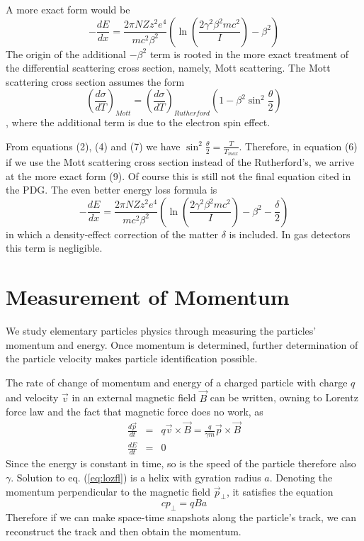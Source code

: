 \documentclass[11pt]{article} %
\begin{document}
A more exact form would be
\begin{equation}
-\frac{dE}{dx}=\frac{2\pi NZz^2e^4}{mc^2\beta^2}\left( \ln\left( \frac{2\gamma^2\beta^2mc^2}{I} \right) -\beta^2\right)
\end{equation}
The origin of the additional $-\beta^2$ term is rooted in the more exact treatment of the differential scattering cross section, namely, Mott scattering. The Mott scattering cross section assumes the form
\begin{equation}
\left( \frac{d\sigma}{dT} \right)_{Mott}=\left( \frac{d\sigma}{dT} \right)_{Rutherford}\left( 1-\beta^2\sin^2\frac{\theta}{2} \right)
\end{equation}
, where the additional term is due to the electron spin effect.

From equations (2), (4) and (7) we have $\sin^2\frac{\theta}{2}=\frac{T}{T_{max}}$. Therefore, in equation (6) if we use the Mott scattering cross section instead of the Rutherford's, we arrive at the more exact form (9). Of course this is still not the final equation cited in the PDG. The even better energy loss formula is
\begin{equation}
-\frac{dE}{dx}=\frac{2\pi NZz^2e^4}{mc^2\beta^2}\left( \ln\left( \frac{2\gamma^2\beta^2mc^2}{I} \right) -\beta^2-\frac{\delta}{2}\right)
\end{equation}
in which a density-effect correction of the matter $\delta$ is included. In gas detectors this term is negligible.


\section{Measurement of Momentum}

We study elementary particles physics through measuring the particles' momentum and energy. Once momentum is determined, further determination of the particle velocity makes particle identification possible.

The rate of change of momentum and energy of a charged particle with charge $q$ and velocity $\vec{v}$ in an external magnetic field $\vec{B}$ can be written, owning to Lorentz force law and the fact that magnetic force does no work, as
\begin{eqnarray}
\frac{d\vec{p}}{dt}&=&q\vec{v}\times\vec{B}=\frac{q}{\gamma m}\vec{p}\times\vec{B} \label{eq:lozfl} \\
\frac{dE}{dt}&=&0
\end{eqnarray}
Since the energy is constant in time, so is the speed of the particle therefore also $\gamma$. Solution to eq. (\ref{eq:lozfl}) is a helix with gyration radius $a$. Denoting the momentum perpendicular to the magnetic field $\vec{p}_\perp$, it satisfies the equation
\begin{equation}
cp_\perp=qBa
\end{equation}
Therefore if we can make space-time snapshots along the particle's track, we can reconstruct the track and then obtain the momentum.
\end{document}
